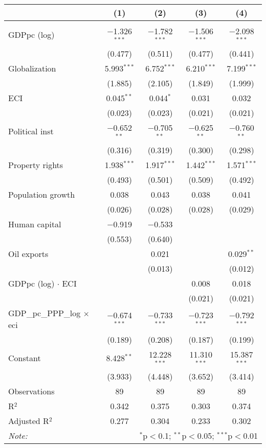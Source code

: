 
\begin{tabular}{@{\hspace{5pt}}l@{\hspace{5pt}}cccc} 
\toprule 
 & (1) & (2) & (3) & (4)\\ 
\midrule  
\\[-2.1ex] GDPpc (log) & $-$1.326$^{***}$ & $-$1.782$^{***}$ & $-$1.506$^{***}$ & $-$2.098$^{***}$ \\ 
  & (0.477) & (0.511) & (0.477) & (0.441) \\ 
 \addlinespace 
 Globalization & 5.993$^{***}$ & 6.752$^{***}$ & 6.210$^{***}$ & 7.199$^{***}$ \\ 
  & (1.885) & (2.105) & (1.849) & (1.999) \\ 
 \addlinespace 
 ECI & 0.045$^{**}$ & 0.044$^{*}$ & 0.031 & 0.032 \\ 
  & (0.023) & (0.023) & (0.021) & (0.021) \\ 
 \addlinespace 
 Political inst & $-$0.652$^{**}$ & $-$0.705$^{**}$ & $-$0.625$^{**}$ & $-$0.760$^{**}$ \\ 
  & (0.316) & (0.319) & (0.300) & (0.298) \\ 
 \addlinespace 
 Property rights & 1.938$^{***}$ & 1.917$^{***}$ & 1.442$^{***}$ & 1.571$^{***}$ \\ 
  & (0.493) & (0.501) & (0.509) & (0.492) \\ 
 \addlinespace 
 Population growth & 0.038 & 0.043 & 0.038 & 0.041 \\ 
  & (0.026) & (0.028) & (0.028) & (0.029) \\ 
 \addlinespace 
 Human capital & $-$0.919 & $-$0.533 &  &  \\ 
  & (0.553) & (0.640) &  &  \\ 
 \addlinespace 
 Oil exports &  & 0.021 &  & 0.029$^{**}$ \\ 
  &  & (0.013) &  & (0.012) \\ 
 \addlinespace 
 GDPpc (log) $\cdot$ ECI &  &  & 0.008 & 0.018 \\ 
  &  &  & (0.021) & (0.021) \\ 
 \addlinespace 
 GDP\_pc\_PPP\_log $\times$ eci & $-$0.674$^{***}$ & $-$0.733$^{***}$ & $-$0.723$^{***}$ & $-$0.792$^{***}$ \\ 
  & (0.189) & (0.208) & (0.187) & (0.199) \\ 
 \addlinespace 
 Constant & 8.428$^{**}$ & 12.228$^{***}$ & 11.310$^{***}$ & 15.387$^{***}$ \\ 
  & (3.933) & (4.448) & (3.652) & (3.414) \\ 
 \addlinespace 
\midrule  
Observations & 89 & 89 & 89 & 89 \\ 
R$^{2}$ & 0.342 & 0.375 & 0.303 & 0.374 \\ 
Adjusted R$^{2}$ & 0.277 & 0.304 & 0.233 & 0.302 \\ 
\bottomrule 
\textit{Note:}  & \multicolumn{4}{r}{$^{*}$p$<$0.1; $^{**}$p$<$0.05; $^{***}$p$<$0.01} \\ 
\end{tabular} 
